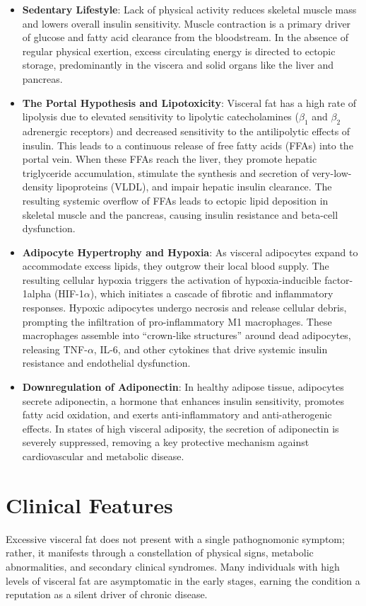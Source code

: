 \begin{itemize}
    \item \textbf{Sedentary Lifestyle}: Lack of physical activity reduces skeletal muscle mass and lowers overall insulin sensitivity. Muscle contraction is a primary driver of glucose and fatty acid clearance from the bloodstream. In the absence of regular physical exertion, excess circulating energy is directed to ectopic storage, predominantly in the viscera and solid organs like the liver and pancreas.
    \item \textbf{The Portal Hypothesis and Lipotoxicity}: Visceral fat has a high rate of lipolysis due to elevated sensitivity to lipolytic catecholamines ($\beta_1$ and $\beta_2$ adrenergic receptors) and decreased sensitivity to the antilipolytic effects of insulin. This leads to a continuous release of free fatty acids (FFAs) into the portal vein. When these FFAs reach the liver, they promote hepatic triglyceride accumulation, stimulate the synthesis and secretion of very-low-density lipoproteins (VLDL), and impair hepatic insulin clearance. The resulting systemic overflow of FFAs leads to ectopic lipid deposition in skeletal muscle and the pancreas, causing insulin resistance and beta-cell dysfunction.
    \item \textbf{Adipocyte Hypertrophy and Hypoxia}: As visceral adipocytes expand to accommodate excess lipids, they outgrow their local blood supply. The resulting cellular hypoxia triggers the activation of hypoxia-inducible factor-1alpha (HIF-1$\alpha$), which initiates a cascade of fibrotic and inflammatory responses. Hypoxic adipocytes undergo necrosis and release cellular debris, prompting the infiltration of pro-inflammatory M1 macrophages. These macrophages assemble into ``crown-like structures'' around dead adipocytes, releasing TNF-$\alpha$, IL-6, and other cytokines that drive systemic insulin resistance and endothelial dysfunction.
    \item \textbf{Downregulation of Adiponectin}: In healthy adipose tissue, adipocytes secrete adiponectin, a hormone that enhances insulin sensitivity, promotes fatty acid oxidation, and exerts anti-inflammatory and anti-atherogenic effects. In states of high visceral adiposity, the secretion of adiponectin is severely suppressed, removing a key protective mechanism against cardiovascular and metabolic disease.
\end{itemize}

\section*{Clinical Features}
Excessive visceral fat does not present with a single pathognomonic symptom; rather, it manifests through a constellation of physical signs, metabolic abnormalities, and secondary clinical syndromes. Many individuals with high levels of visceral fat are asymptomatic in the early stages, earning the condition a reputation as a silent driver of chronic disease.

